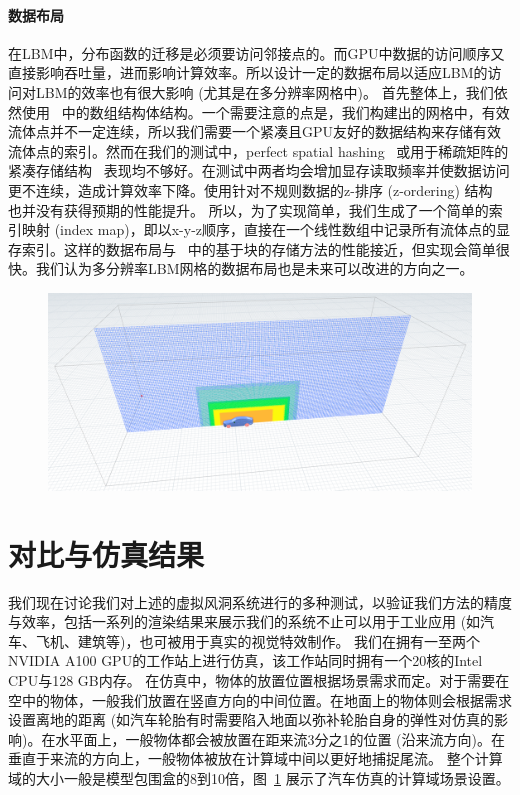 \paragraph{数据布局}
在LBM中，分布函数的迁移是必须要访问邻接点的。而GPU中数据的访问顺序又直接影响吞吐量，进而影响计算效率。所以设计一定的数据布局以适应LBM的访问对LBM的效率也有很大影响 (尤其是在多分辨率网格中)。
首先整体上，我们依然使用~\cite{Chen-2021} 中的数组结构体结构。一个需要注意的点是，我们构建出的网格中，有效流体点并不一定连续，所以我们需要一个紧凑且GPU友好的数据结构来存储有效流体点的索引。然而在我们的测试中，perfect spatial hashing~\cite{Lefebvre-2006} 或用于稀疏矩阵的紧凑存储结构~\cite{Greathouse-2014} 表现均不够好。在测试中两者均会增加显存读取频率并使数据访问更不连续，造成计算效率下降。使用针对不规则数据的z-排序 (z-ordering) 结构~\cite{Chen-2021} 也并没有获得预期的性能提升。
所以，为了实现简单，我们生成了一个简单的索引映射 (index map)，即以x-y-z顺序，直接在一个线性数组中记录所有流体点的显存索引。这样的数据布局与~\cite{Chen-2021} 中的基于块的存储方法的性能接近，但实现会简单很快。我们认为多分辨率LBM网格的数据布局也是未来可以改进的方向之一。

\begin{figure}[htb]
    \centering
      \includegraphics[width=0.99\columnwidth]{figures/domain_setup.png}
    \label{img:domain_setup}
  \end{figure}

\section{对比与仿真结果}
我们现在讨论我们对上述的虚拟风洞系统进行的多种测试，以验证我们方法的精度与效率，包括一系列的渲染结果来展示我们的系统不止可以用于工业应用 (如汽车、飞机、建筑等)，也可被用于真实的视觉特效制作。
我们在拥有一至两个NVIDIA A100 GPU的工作站上进行仿真，该工作站同时拥有一个20核的Intel CPU与128 GB内存。
在仿真中，物体的放置位置根据场景需求而定。对于需要在空中的物体，一般我们放置在竖直方向的中间位置。在地面上的物体则会根据需求设置离地的距离 (如汽车轮胎有时需要陷入地面以弥补轮胎自身的弹性对仿真的影响)。在水平面上，一般物体都会被放置在距来流3分之1的位置 (沿来流方向)。在垂直于来流的方向上，一般物体被放在计算域中间以更好地捕捉尾流。
整个计算域的大小一般是模型包围盒的8到10倍，图~\ref{img:domain_setup} 展示了汽车仿真的计算域场景设置。

